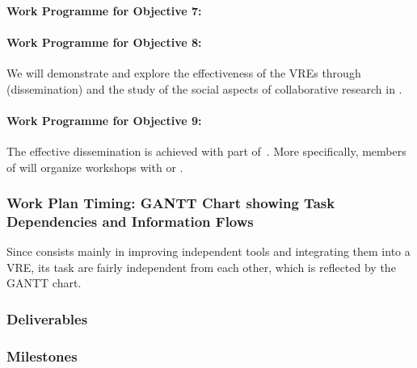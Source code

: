 \documentclass[noworkareas,deliverables,\classoptions]{euproposal}       %
\begin{document}
\begin{proposal}
\paragraph{Work Programme for Objective 7: }


\paragraph{Work Programme for Objective 8: }

We will demonstrate and explore the effectiveness of the VREs through
 (dissemination) and the study of the social aspects of
collaborative research in .

\paragraph{Work Programme for Objective 9: }

The effective dissemination is achieved with part of~. More
specifically, members of \TheProject will organize workshops with 
or .


\subsubsection{Work Plan Timing: GANTT Chart showing Task Dependencies and Information Flows}

Since \TheProject consists mainly in improving independent tools and
integrating them into a VRE, its task are fairly independent from each
other, which is reflected by the GANTT chart.


\enlargethispage{5cm}

\gantttaskchart[draft,xscale=.28,yscale=.24] 

\newpage
\subsubsection{Deliverables}\label{sec:deliverables}

\subsubsection{Milestones}\label{sec:milestones}




\end{proposal}
\end{document}
